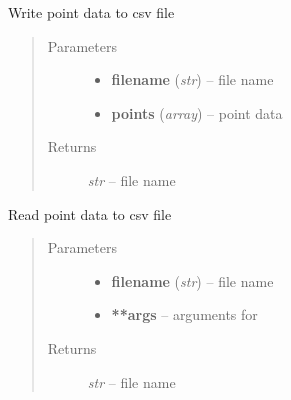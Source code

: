 \documentclass[letterpaper,10pt,english]{sphinxmanual}
\begin{document}
\begin{fulllineitems}
\label{api/ClearMap.IO:ClearMap.IO.CSV.writePoints}
Write point data to csv file
\begin{quote}\begin{description}
\item[{Parameters}] \leavevmode\begin{itemize}
\item {} 
\textbf{filename} (\emph{str}) --
file name

\item {} 
\textbf{points} (\emph{array}) --
point data

\end{itemize}

\item[{Returns}] \leavevmode
\emph{str} --
file name

\end{description}\end{quote}

\end{fulllineitems}


\begin{fulllineitems}
\label{api/ClearMap.IO:ClearMap.IO.CSV.readPoints}
Read point data to csv file
\begin{quote}\begin{description}
\item[{Parameters}] \leavevmode\begin{itemize}
\item {} 
\textbf{filename} (\emph{str}) --
file name

\item {} 
\textbf{**args} --
arguments for 

\end{itemize}

\item[{Returns}] \leavevmode
\emph{str} --
file name

\end{description}\end{quote}

\end{fulllineitems}

\end{document}
